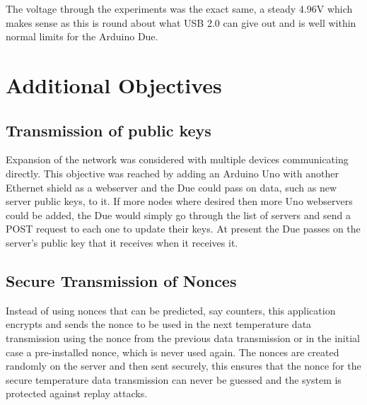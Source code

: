 The voltage through the experiments was the exact same, a steady 4.96V which makes sense as this is round about what USB 2.0 can give out and is well within normal limits for the Arduino Due.




\section{Additional Objectives}

\subsection{Transmission of public keys}

Expansion of the network was considered with multiple devices communicating directly. This objective was reached by adding an Arduino Uno with another Ethernet shield as a webserver and the Due could pass on data, such as new server public keys, to it. If more nodes where desired then more Uno webservers could be added, the Due would simply go through the list of servers and send a POST request to each one to update their keys. At present the Due passes on the server's public key that it receives when it receives it. 

\subsection{Secure Transmission of Nonces}

Instead of using nonces that can be predicted, say counters, this application encrypts and sends the nonce to be used in the next temperature data transmission using the nonce from the previous data transmission or in the initial case a pre-installed nonce, which is never used again. The nonces are created randomly on the server and then sent securely, this ensures that the nonce for the secure temperature data transmission can never be guessed and the system is protected against replay attacks.

